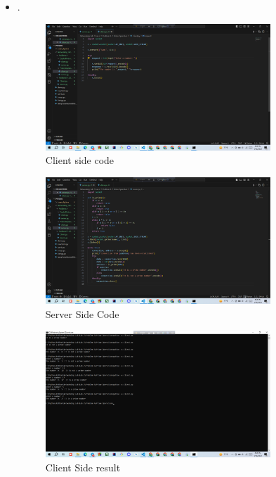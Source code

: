 \documentclass[11pt]{article}
\begin{document}
\begin{itemize}
    \item \textbf{}
    
  . 
    \begin{figure}[H]
        \centering
        \includegraphics[width=0.8\textwidth]{prime.client.png}
        \caption{Client side code}
        \label{fig:1}
    \end{figure}
    
    \begin{figure}[H]
        \centering
        \includegraphics[width=0.8\textwidth]{prime.server.png}
        \caption{Server Side Code}
        \label{fig:2}
    \end{figure}
    
    \begin{figure}[H]
      \centering
      \includegraphics[width=0.8\textwidth]{prime_result.client.png}
      \caption{Client Side result}
      \label{fig:3}
    \end{figure}
    

\end{itemize}
\end{document}
